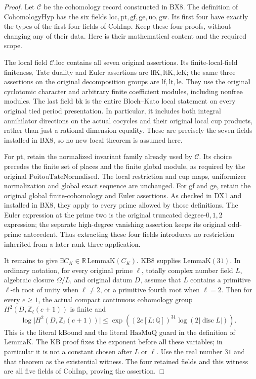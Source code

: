 \begin{proof}
Let \(\mathcal C\) be the cohomology record constructed in BX8.
The definition of \(\mathrm{CohomologyHyp}\) has the six fields
\(\mathrm{loc},\mathrm{pt},\mathrm{gf},\mathrm{ge},
\mathrm{uo},\mathrm{gw}\).  Its first four have exactly the
types of the first four fields of \(\mathrm{CohInp}\).
Keep these four proofs, without changing any of their data.
Here is their mathematical content and the required scope.

The local field \(\mathcal C.\mathrm{loc}\) contains all seven
original assertions.  Its finite-local-field finiteness, Tate
duality and Euler assertions are \(\mathrm{lfK},\mathrm{ltK},
\mathrm{leK}\); the same three assertions on the original
decomposition groups are \(\mathrm{lf},\mathrm{lt},\mathrm{le}\).
They use the original cyclotomic character and arbitrary finite
coefficient modules, including nonfree modules.  The last field
\(\mathrm{bk}\) is the entire Bloch--Kato local statement on
every original tied period presentation.  In particular, it includes
both integral annihilator directions on the actual cocycles and
their original local cup products, rather than just a rational
dimension equality.  These are precisely the seven fields installed
in BX8, so no new local theorem is assumed here.

For \(\mathrm{pt}\), retain the normalized invariant family
already used by \(\mathcal C\).  Its choice precedes the finite
set of places and the finite global module, as required by the
original \(\mathrm{PoitouTateNormalised}\).  The local restriction
and cup maps, uniformizer normalization and global exact sequence
are unchanged.  For \(\mathrm{gf}\) and \(\mathrm{ge}\), retain
the original global finite-cohomology and Euler assertions.  As
checked in DX1 and installed in BX8, they apply to every prime
allowed by those definitions.  The Euler expression at the prime
two is the original truncated degree-\(0,1,2\) expression; the
separate high-degree vanishing assertion keeps its original
odd-prime antecedent.  Thus extracting these four fields introduces
no restriction inherited from a later rank-three application.

It remains to give \(\exists C_K\in\mathbb R\,
\mathrm{LemmaK}(C_K)\).  KB8 supplies \(\mathrm{LemmaK}(31)\).
In ordinary notation, for every original prime \(\ell\), totally
complex number field \(L\), algebraic closure \(\Omega/L\),
and original datum \(D\), assume that \(L\) contains a primitive
\(\ell\)-th root of unity when \(\ell\ne2\), or a primitive
fourth root when \(\ell=2\).  Then for every \(e\ge1\), the
actual compact continuous cohomology group
\(H^2(D,\mathbb Z_\ell(e+1))\) is finite and
\[
 \log\bigl|H^2(D,\mathbb Z_\ell(e+1))\bigr|
 \le
 \exp\!\left((2e[L:\mathbb Q])^{31}
                    \log(2|\operatorname{disc}L|)\right).
 \tag{KIZ.1}
\]
This is the literal \(\mathrm{kBound}\) and the literal
\(\mathrm{HasMuQ}\) guard in the definition of \(\mathrm{LemmaK}\).
The KB proof fixes the exponent before all these variables; in
particular it is not a constant chosen after \(L\) or \(\ell\).
Use the real number \(31\) and that theorem as the existential
witness.  The four retained fields and this witness are all five
fields of \(\mathrm{CohInp}\), proving the assertion.
\end{proof}
